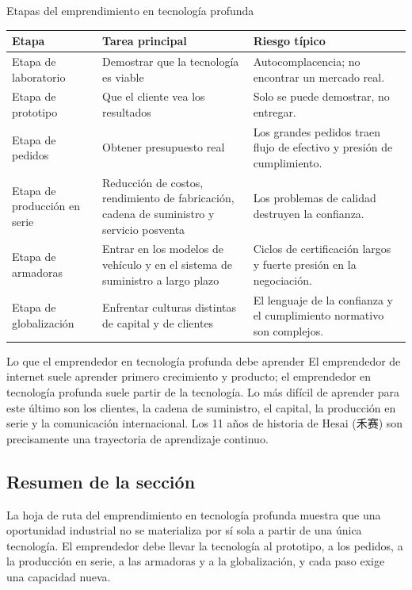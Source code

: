 \documentclass[a4paper]{article}
\begin{document}
\begin{knowledgebox}{Etapas del emprendimiento en tecnología profunda}
\begin{tabularx}{\textwidth}{p{}p{}X}
\toprule
Etapa & Tarea principal & Riesgo típico \\
\midrule
Etapa de laboratorio & Demostrar que la tecnología es viable & Autocomplacencia; no encontrar un mercado real. \\
Etapa de prototipo & Que el cliente vea los resultados & Solo se puede demostrar, no entregar. \\
Etapa de pedidos & Obtener presupuesto real & Los grandes pedidos traen flujo de efectivo y presión de cumplimiento. \\
Etapa de producción en serie & Reducción de costos, rendimiento de fabricación, cadena de suministro y servicio posventa & Los problemas de calidad destruyen la confianza. \\
Etapa de armadoras & Entrar en los modelos de vehículo y en el sistema de suministro a largo plazo & Ciclos de certificación largos y fuerte presión en la negociación. \\
Etapa de globalización & Enfrentar culturas distintas de capital y de clientes & El lenguaje de la confianza y el cumplimiento normativo son complejos. \\
\bottomrule
\end{tabularx}
\end{knowledgebox}

\begin{importantbox}{Lo que el emprendedor en tecnología profunda debe aprender}
El emprendedor de internet suele aprender primero crecimiento y producto; el emprendedor en tecnología profunda suele partir de la tecnología. Lo más difícil de aprender para este último son los clientes, la cadena de suministro, el capital, la producción en serie y la comunicación internacional. Los 11 años de historia de Hesai (禾赛) son precisamente una trayectoria de aprendizaje continuo.
\end{importantbox}

\subsection{Resumen de la sección}

La hoja de ruta del emprendimiento en tecnología profunda muestra que una oportunidad industrial no se materializa por sí sola a partir de una única tecnología. El emprendedor debe llevar la tecnología al prototipo, a los pedidos, a la producción en serie, a las armadoras y a la globalización, y cada paso exige una capacidad nueva.
\end{document}
